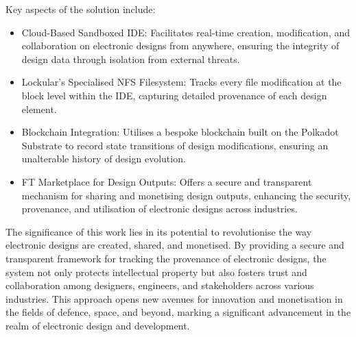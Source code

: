\documentclass{tufte-handout}
\begin{document}
Key aspects of the solution include:
\begin{itemize}
    \item Cloud-Based Sandboxed IDE: Facilitates real-time creation, modification, and collaboration on electronic designs from anywhere, ensuring the integrity
    of design data through isolation from external threats.
    \item Lockular's Specialised NFS Filesystem: Tracks every file modification at the block level within the IDE, capturing detailed provenance of each design element.
    \item Blockchain Integration: Utilises a bespoke blockchain built on the Polkadot Substrate to record state transitions of design modifications,
    ensuring an unalterable history of design evolution.
    \item FT Marketplace for Design Outputs: Offers a secure and transparent mechanism for sharing and monetising design outputs, enhancing the security,
    provenance, and utilisation of electronic designs across industries.
\end{itemize}

The significance of this work lies in its potential to revolutionise the way electronic designs are created, shared, and monetised. By providing a secure
and transparent framework for tracking the provenance of electronic designs, the system not only protects intellectual property but also fosters trust and
collaboration among designers, engineers, and stakeholders across various industries. This approach opens new avenues for innovation and monetisation in
the fields of defence, space, and beyond, marking a significant advancement in the realm of electronic design and development.


\end{document}
